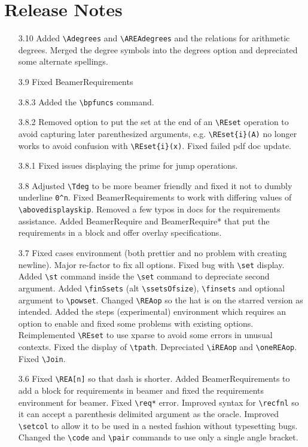 \documentclass[leqno,11pt]{amsart}
\begin{document}
\section{Release Notes}


\begin{itemize}
	\item[3.10]  Added \verb=\Adegrees= and \verb=\AREAdegrees= and the relations for arithmetic degrees.  Merged the degree symbols into the degrees option and depreciated some alternate spellings.
	\item[3.9]  Fixed BeamerRequirements
	\item[3.8.3]  Added the \verb=\bpfuncs= command.
	\item[3.8.2] Removed option to put the set at the end of an \verb=\REset= operation to avoid capturing later parenthesized arguments, e.g. \verb=\REset{i}(A)= no longer works to avoid confusion with \verb=\REset{i}(x)=.  Fixed failed pdf doc update.
	\item[3.8.1] Fixed issues displaying the prime for jump operations.
	\item[3.8] Adjusted \verb=\Tdeg= to be more beamer friendly and fixed it not to dumbly underline \verb=0^n=.  Fixed BeamerRequirements to work with differing values of \verb=\abovedisplayskip=.  Removed a few typos in docs for the requirements assistance.  Added BeamerRequire and BeamerRequire* that put the requirements in a block and offer overlay specifications.
	\item[3.7] Fixed cases environment (both prettier and no problem with creating newline).  Major re-factor to fix all options.  Fixed bug with \verb=\set= display.  Added \verb=\st= command inside the \verb=\set= command to depreciate second argument.  Added \verb=\finSsets= (alt \verb=\ssetsOfsize=), \verb=\finsets= and optional argument to \verb=\powset=.  Changed \verb=\REAop= so the hat is on the starred version as intended.  Added the steps (experimental) environment which requires an option to enable and fixed some problems with existing options.  Reimplemented \verb=\REset= to use xparse to avoid some errors in unusual contexts.  Fixed the display of \verb=\tpath=.   Depreciated \verb=\iREAop= and \verb=\oneREAop=.  Fixed \verb=\Join=.
	\item[3.6] Fixed \verb=\REA[n]= so that dash is shorter.  Added BeamerRequirements to add a block for requirements in beamer and fixed the requirements environment for beamer.  Fixed \verb=\req*= error.  Improved syntax for \verb=\recfnl= so it can accept a parenthesis delimited argument as the oracle.  Improved \verb=\setcol= to allow it to be used in a nested fashion without typesetting bugs.  Changed the \verb=\code= and \verb=\pair= commands to use only a single angle bracket.

\end{itemize}
\end{document}
